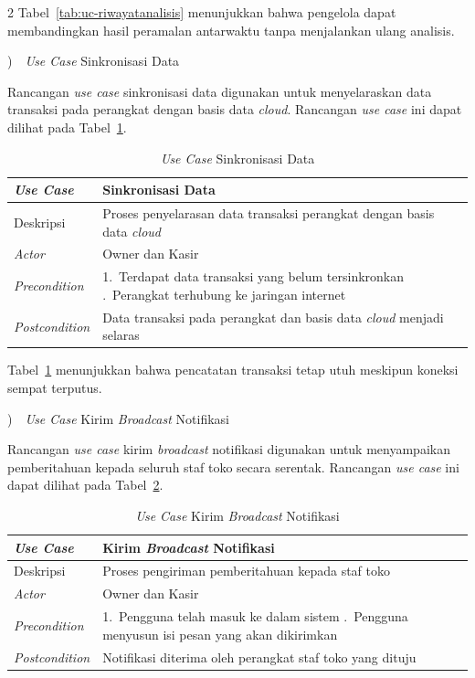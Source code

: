 \documentclass[12pt, a4paper, onecolumn, oneside]{report}
\begin{document}
\begin{spacing}{2}
Tabel~\ref{tab:uc-riwayatanalisis} menunjukkan bahwa pengelola dapat membandingkan hasil peramalan antarwaktu tanpa menjalankan ulang analisis.

)~~\textit{Use Case} Sinkronisasi Data

Rancangan \textit{use case} sinkronisasi data digunakan untuk menyelaraskan data transaksi pada perangkat dengan basis data \textit{cloud}. Rancangan \textit{use case} ini dapat dilihat pada Tabel~\ref{tab:uc-sinkron}.

\begin{table}[H]
\centering
\caption{\textit{Use Case} Sinkronisasi Data}
\label{tab:uc-sinkron}
\begin{tabularx}{\textwidth}{|p{3.2cm}|X|}
\hline
\textbf{\textit{Use Case}} & \textbf{Sinkronisasi Data} \\ \hline
Deskripsi & Proses penyelarasan data transaksi perangkat dengan basis data \textit{cloud} \\ \hline
\textit{Actor} & Owner dan Kasir \\ \hline
\textit{Precondition} & 1.~Terdapat data transaksi yang belum tersinkronkan \newline 2.~Perangkat terhubung ke jaringan internet \\ \hline
\textit{Postcondition} & Data transaksi pada perangkat dan basis data \textit{cloud} menjadi selaras \\ \hline
\end{tabularx}
\end{table}

Tabel~\ref{tab:uc-sinkron} menunjukkan bahwa pencatatan transaksi tetap utuh meskipun koneksi sempat terputus.

)~~\textit{Use Case} Kirim \textit{Broadcast} Notifikasi

Rancangan \textit{use case} kirim \textit{broadcast} notifikasi digunakan untuk menyampaikan pemberitahuan kepada seluruh staf toko secara serentak. Rancangan \textit{use case} ini dapat dilihat pada Tabel~\ref{tab:uc-broadcast}.

\begin{table}[H]
\centering
\caption{\textit{Use Case} Kirim \textit{Broadcast} Notifikasi}
\label{tab:uc-broadcast}
\begin{tabularx}{\textwidth}{|p{3.2cm}|X|}
\hline
\textbf{\textit{Use Case}} & \textbf{Kirim \textit{Broadcast} Notifikasi} \\ \hline
Deskripsi & Proses pengiriman pemberitahuan kepada staf toko \\ \hline
\textit{Actor} & Owner dan Kasir \\ \hline
\textit{Precondition} & 1.~Pengguna telah masuk ke dalam sistem \newline 2.~Pengguna menyusun isi pesan yang akan dikirimkan \\ \hline
\textit{Postcondition} & Notifikasi diterima oleh perangkat staf toko yang dituju \\ \hline
\end{tabularx}
\end{table}


\end{spacing}
\end{document}
